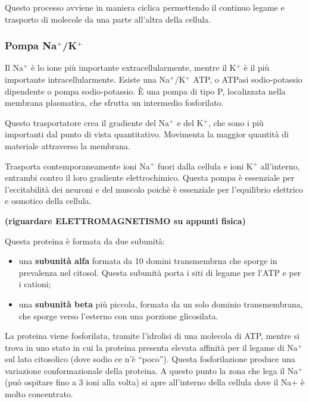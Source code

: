 \documentclass[]{article}
\begin{document}
Questo processo avviene in maniera ciclica permettendo il continuo
legame e trasporto di molecole da una parte all'altra della cellula.

\subsubsection{\texorpdfstring{Pompa
Na\(^+\)/K\(^+\)}{Pompa Na\^{}+/K\^{}+}}\label{pompa-nak}

Il Na\(^+\) è lo ione più importante extracellularmente, mentre il
K\(^+\) è il più importante intracellularmente. Esiste una
Na\(^+\)/K\(^+\) ATP, o ATPasi sodio-potassio dipendente o pompa
sodio-potassio. È una pompa di tipo P, localizzata nella membrana
plasmatica, che sfrutta un intermedio fosforilato.

Questo trasportatore crea il gradiente del Na\(^+\) e del K\(^+\), che
sono i più importanti dal punto di vista quantitativo. Movimenta la
maggior quantità di materiale attraverso la membrana.

Trasporta contemporaneamente ioni Na\(^+\) fuori dalla cellula e ioni
K\(^+\) all'interno, entrambi contro il loro gradiente elettrochimico.
Questa pompa è essenziale per l'eccitabilità dei neuroni e del muscolo
poichè è essenziale per l'equilibrio elettrico e osmotico della cellula.

\textbf{(riguardare ELETTROMAGNETISMO su appunti fisica)}

Questa proteina è formata da due subunità:

\begin{itemize}
\itemsep1pt\parskip0pt
\item
  una \textbf{subunità alfa} formata da 10 domini transmembrna che
  sporge in prevalenza nel citosol. Questa subunità porta i siti di
  legame per l'ATP e per i cationi;
\item
  una \textbf{subunità beta} più piccola, formata da un solo dominio
  transmembrana, che sporge verso l'esterno con una porzione
  glicosilata.
\end{itemize}

La proteina viene fosforilata, tramite l'idrolisi di una molecola di
ATP, mentre si trova in uno stato in cui la proteina presenta elevata
affinità per il legame di Na\(^+\) sul lato citosolico (dove sodio ce
n'è ``poco''). Questa fosforilazione produce una variazione
conformazionale della proteina. A questo punto la zona che lega il
Na\(^+\) (può ospitare fino a 3 ioni alla volta) si apre all'interno
della cellula dove il Na+ è molto concentrato.
\end{document}
